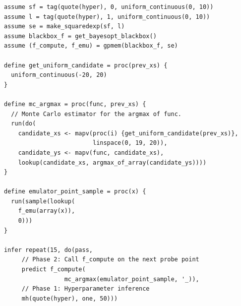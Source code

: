 \begin{minipage}{\linewidth}
\small
\belowcaptionskip=-10pt
\begin{lstlisting}[frame=single,caption={
  Code for Bayesian optimization using \gpmem.
  %The procedure \texttt{V\_compute} probes \texttt{V} directly, thus improving the GP model \texttt{V\_emu}.
  %(\texttt{V\_emu\_pointwise} is simply a shortcut for sampling the GP model at a single point; \texttt{V\_emu} is more general, allowing joint samples to be taken at any set of points.)
  In the loop, \texttt{V\_compute} is called to probe the value of \texttt{V} at a new argument.
  The new argument, \texttt{(mc\_argmax V\_emu\_pointwise mc\_sampler)}, is a Monte Carlo estimate of the maximum pointwise sample of \texttt{V\_emu} (itself a stochastic quantity), with the Monte Carlo samples being drawn in this case uniformly between $-20$ and $20$.
  After each new call to \texttt{V\_compute}, the Metropolis--Hastings algorithm is used to perform inference on the hyperparameters of the covariance function in the GP model in light of the new conditioning data.
  Once enough calls to \texttt{V\_compute} have been made (in our case we stopped at 15 calls), we can inspect the full list of probed $(a,r)$ pairs with \texttt{extract\_stats}.
  The answer to our maximization problem is simply the pair having the highest $r$; but our algorithm also learns more potentially useful information.},mathescape,numbers=none,label=alg:bayesopt]
assume sf = tag(quote(hyper), 0, uniform_continuous(0, 10))
assume l = tag(quote(hyper), 1, uniform_continuous(0, 10))
assume se = make_squaredexp(sf, l)
assume blackbox_f = get_bayesopt_blackbox()
assume (f_compute, f_emu) = gpmem(blackbox_f, se)

define get_uniform_candidate = proc(prev_xs) {
  uniform_continuous(-20, 20)
}

define mc_argmax = proc(func, prev_xs) {
  // Monte Carlo estimator for the argmax of func.
  run(do(
    candidate_xs <- mapv(proc(i) {get_uniform_candidate(prev_xs)},
                         linspace(0, 19, 20)),
    candidate_ys <- mapv(func, candidate_xs),
    lookup(candidate_xs, argmax_of_array(candidate_ys))))
}

define emulator_point_sample = proc(x) {
  run(sample(lookup(
    f_emu(array(x)),
    0)))
}

infer repeat(15, do(pass,
     // Phase 2: Call f_compute on the next probe point
     predict f_compute(
                 mc_argmax(emulator_point_sample, '_)),
     // Phase 1: Hyperparameter inference
     mh(quote(hyper), one, 50)))
\end{lstlisting}
\end{minipage}
      
